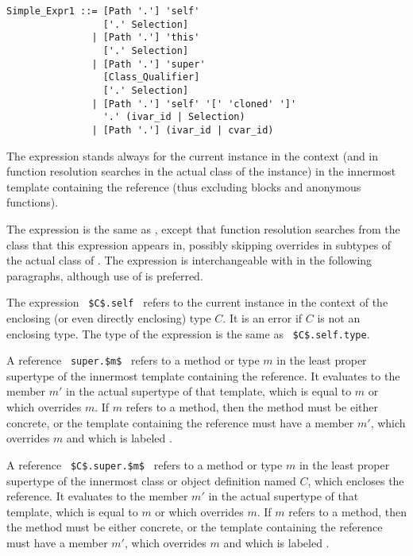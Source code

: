 \syntax\begin{lstlisting}
Simple_Expr1 ::= [Path '.'] 'self'
                 ['.' Selection]
               | [Path '.'] 'this'
                 ['.' Selection]
               | [Path '.'] 'super' 
                 [Class_Qualifier] 
                 ['.' Selection]
               | [Path '.'] 'self' '[' 'cloned' ']'
                 '.' (ivar_id | Selection)
               | [Path '.'] (ivar_id | cvar_id)
\end{lstlisting}

The expression  stands always for the current instance in the context (and in function resolution searches in the actual class of the instance) in the innermost template containing the reference (thus excluding blocks and anonymous functions). 

The expression  is the same as , except that function resolution searches from the class that this expression appears in, possibly skipping overrides in subtypes of the actual class of . The  expression is interchangeable with  in the following paragraphs, although use of  is preferred. 

The expression ~\lstinline!$C$.self!~ refers to the current instance in the context of the enclosing (or even directly enclosing) type $C$. It is an error if $C$ is not an enclosing type. The type of the expression is the same as ~\lstinline!$C$.self.type!. 

A reference ~\lstinline!super.$m$!~ refers to a method or type $m$ in the least proper supertype of the innermost template containing the reference. It evaluates to the member $m'$ in the actual supertype of that template, which is equal to $m$ or which overrides $m$. If $m$ refers to a method, then the method must be either concrete, or the template containing the reference must have a member $m'$, which overrides $m$ and which is labeled . 

A reference ~\lstinline!$C$.super.$m$!~ refers to a method or type $m$ in the least proper supertype of the innermost class or object definition named $C$, which encloses the reference. It evaluates to the member $m'$ in the actual supertype of that template, which is equal to $m$ or which overrides $m$. If $m$ refers to a method, then the method must be either concrete, or the template containing the reference must have a member $m'$, which overrides $m$ and which is labeled . 

